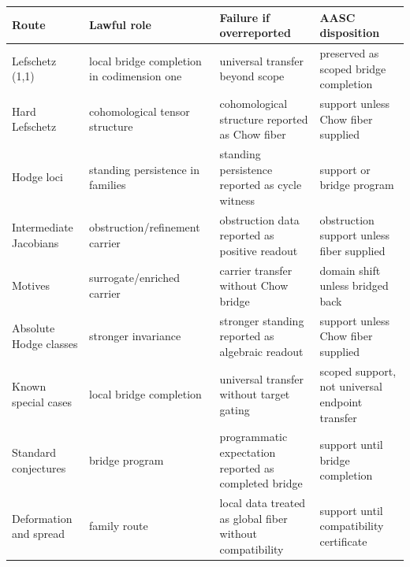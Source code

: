 \documentclass[11pt]{article}
\begin{document}
{\scriptsize
\begin{longtable}{p{}p{}p{}p{}}
\toprule
Route & Lawful role & Failure if overreported & AASC disposition\\
\midrule
\endhead
Lefschetz (1,1) & local bridge completion in codimension one & universal transfer beyond scope & preserved as scoped bridge completion\\
Hard Lefschetz & cohomological tensor structure & cohomological structure reported as Chow fiber & support unless Chow fiber supplied\\
Hodge loci & standing persistence in families & standing persistence reported as cycle witness & support or bridge program\\
Intermediate Jacobians & obstruction/refinement carrier & obstruction data reported as positive readout & obstruction support unless fiber supplied\\
Motives & surrogate/enriched carrier & carrier transfer without Chow bridge & domain shift unless bridged back\\
Absolute Hodge classes & stronger invariance & stronger standing reported as algebraic readout & support unless Chow fiber supplied\\
Known special cases & local bridge completion & universal transfer without target gating & scoped support, not universal endpoint transfer\\
Standard conjectures & bridge program & programmatic expectation reported as completed bridge & support until bridge completion\\
Deformation and spread & family route & local data treated as global fiber without compatibility & support until compatibility certificate\\
\bottomrule
\end{longtable}
}
\end{document}
